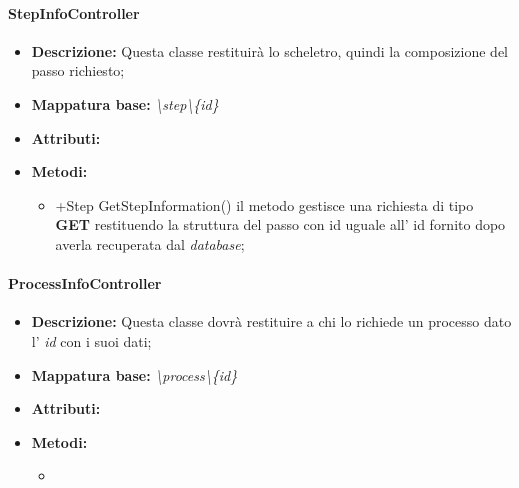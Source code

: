 \paragraph{StepInfoController}%
\begin{itemize}
	\item \textbf{Descrizione: }Questa classe restituirà lo scheletro, quindi la composizione del passo richiesto;
	\item \textbf{Mappatura base: }\textit{\textbackslash step\textbackslash \{id\}}
	\item \textbf{Attributi: }
	\item \textbf{Metodi: }\begin{itemize}
					\item +Step GetStepInformation() il metodo gestisce una richiesta di tipo \textbf{GET} restituendo la struttura del passo con id uguale all' id fornito dopo averla recuperata dal \textit{database};
				\end{itemize}
\end{itemize}
\paragraph{ProcessInfoController}%
\begin{itemize}
	\item \textbf{Descrizione: } Questa classe dovrà restituire a chi lo richiede un processo dato l' \textit{id} con i suoi dati;
	\item \textbf{Mappatura base: }\textit{\textbackslash process\textbackslash \{id\}}
	\item \textbf{Attributi: }
	\item \textbf{Metodi: }\begin{itemize}
					\item 
				\end{itemize}
\end{itemize}